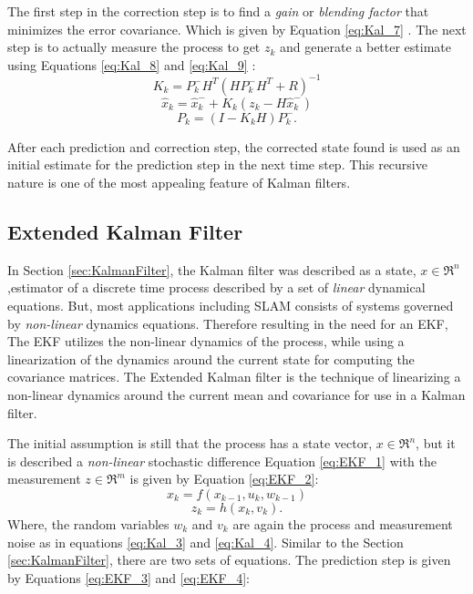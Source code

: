 The first step in the correction step is to find a \textit{gain} or \textit{blending factor} that minimizes the error covariance. Which is given by Equation \ref{eq:Kal_7} \cite{Kalman1960,Maybeck1979,Jacobs1993,Brown2012}. 
The next step is to actually measure the process to get $ z_k $ and generate a better estimate using Equations \ref{eq:Kal_8} and \ref{eq:Kal_9} \cite{WelchandBishop1995}:
\begin{equation}
\label{eq:Kal_7}
K_k = P^-_kH^T(HP^-_kH^T+R)^{-1}
\end{equation}
\begin{equation}
\label{eq:Kal_8}
\hat{x}_k = \hat{x}^-_k+K_k(z_k-H\hat{x}^-_k)
\end{equation}
\begin{equation}
\label{eq:Kal_9}
P_k = (I-K_kH)P^-_k.
\end{equation} 

After each prediction and correction step, the corrected state found is used as an initial estimate for the prediction step in the next time step. This recursive nature is one of the most appealing feature of Kalman filters. 

\subsection{Extended Kalman Filter}
\label{sec:EKF}

 In Section \ref{sec:KalmanFilter}, the Kalman filter was described as a state, $ x \in \Re^n $,estimator of a discrete time process described by a set of \textit{linear} dynamical equations. But, most applications including SLAM consists of systems governed by \textit{non-linear} dynamics equations. Therefore resulting in the need for an EKF, The EKF utilizes the non-linear dynamics of the process, while using a linearization of the dynamics around the current state for computing the covariance matrices.  The Extended Kalman filter is the technique of linearizing a non-linear dynamics around the current mean and covariance for use in a Kalman filter.
 
 The initial assumption is still that the process has a state vector, $ x \in \Re^n $, but it is described a \textit{non-linear} stochastic difference Equation \ref{eq:EKF_1} with the measurement $ z \in \Re^m $ is given by Equation \ref{eq:EKF_2}:
 \begin{equation}
 \label{eq:EKF_1}
 x_k = f(x_{k-1},u_k,w_{k-1})
 \end{equation}
 \begin{equation}
 \label{eq:EKF_2}
 z_k = h(x_k,v_k).
 \end{equation}
Where, the random variables $ w_k$  and  $v_k $ are again the process and measurement noise as in equations \ref{eq:Kal_3} and \ref{eq:Kal_4}. Similar to the Section \ref{sec:KalmanFilter}, there are two sets of equations. The prediction step is given by Equations \ref{eq:EKF_3} and \ref{eq:EKF_4}:


